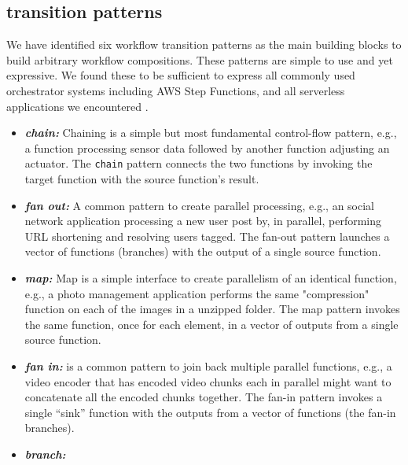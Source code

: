 \subsection{ transition patterns}
\label{sec:transition-patterns}


We have identified six workflow transition patterns as the main building blocks to build arbitrary workflow compositions. These patterns are simple to use and yet expressive. We found these to be sufficient to express all commonly used orchestrator systems including AWS Step
Functions,  and all serverless applications we encountered . 
\begin{itemize}
	\item \textit{\textbf{chain:} }
		Chaining is a simple but most fundamental control-flow pattern, e.g.,  a function processing sensor data followed by another function adjusting an	actuator. The \texttt{chain} pattern connects the
		two functions by invoking the target function with the source function's
		result. 

	\item \textit{\textbf{fan out:}} 
	A common pattern to create parallel processing,  e.g.,  an social network application processing a new user post by, in parallel, performing
	 URL shortening
	and resolving users tagged. 
	The fan-out pattern
	launches a vector of functions (branches) with the output of a single
	source function. 
	\item \textit{\textbf{map: }} Map is a simple interface to create parallelism of an identical function, e.g.,  a photo management application performs the same "compression" function on
	each of the images in a unzipped folder.  The map pattern invokes the same
function, once for each element, in a vector of outputs from a single source
function.
	\item \textit{\textbf{fan in:}} is a common pattern to join back multiple parallel functions, e.g., a video encoder that has encoded video chunks each in parallel might want to concatenate all the encoded
	chunks together. The fan-in pattern invokes a single ``sink''
	function with the outputs from a vector of functions (the fan-in branches).
	
	\item \textit{\textbf{branch:}} 


\end{itemize}
